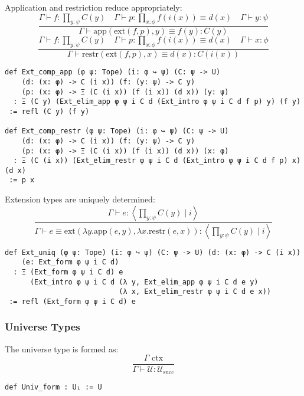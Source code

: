 \documentclass{article}
\begin{document}
\begin{theorem}
Application and restriction reduce appropriately:
\[
\frac{\Gamma \vdash f : \prod_{y : \psi} C(y) \quad \Gamma \vdash p : \prod_{x : \phi} f(i(x)) \equiv d(x) \quad \Gamma \vdash y : \psi}{\Gamma \vdash \text{app}(\text{ext}(f, p), y) \equiv f(y) : C(y)}
\]
\[
\frac{\Gamma \vdash f : \prod_{y : \psi} C(y) \quad \Gamma \vdash p : \prod_{x : \phi} f(i(x)) \equiv d(x) \quad \Gamma \vdash x : \phi}{\Gamma \vdash \text{restr}(\text{ext}(f, p), x) \equiv d(x) : C(i(x))}
\]
\begin{lstlisting}[mathescape=true]
def Ext_comp_app (φ ψ: Tope) (i: φ ↪ ψ) (C: ψ -> U)
    (d: (x: φ) -> C (i x)) (f: (y: ψ) -> C y)
    (p: (x: φ) -> Ξ (C (i x)) (f (i x)) (d x)) (y: ψ)
  : Ξ (C y) (Ext_elim_app φ ψ i C d (Ext_intro φ ψ i C d f p) y) (f y)
 := refl (C y) (f y)

def Ext_comp_restr (φ ψ: Tope) (i: φ ↪ ψ) (C: ψ -> U)
    (d: (x: φ) -> C (i x)) (f: (y: ψ) -> C y)
    (p: (x: φ) -> Ξ (C (i x)) (f (i x)) (d x)) (x: φ)
  : Ξ (C (i x)) (Ext_elim_restr φ ψ i C d (Ext_intro φ ψ i C d f p) x) (d x)
 := p x
\end{lstlisting}
\end{theorem}

\begin{theorem}
Extension types are uniquely determined:
\[
\frac{\Gamma \vdash e : \left\langle \prod_{y : \psi} C(y) \mid i \right\rangle}{\Gamma \vdash e \equiv \text{ext}(\lambda y . \text{app}(e, y), \lambda x . \text{restr}(e, x)) : \left\langle \prod_{y : \psi} C(y) \mid i \right\rangle}
\]
\begin{lstlisting}[mathescape=true]
def Ext_uniq (φ ψ: Tope) (i: φ ↪ ψ) (C: ψ -> U) (d: (x: φ) -> C (i x))
    (e: Ext_form φ ψ i C d)
  : Ξ (Ext_form φ ψ i C d) e
      (Ext_intro φ ψ i C d (λ y, Ext_elim_app φ ψ i C d e y)
                           (λ x, Ext_elim_restr φ ψ i C d e x))
 := refl (Ext_form φ ψ i C d) e
\end{lstlisting}
\end{theorem}

\subsubsection{Universe Types}

\begin{definition}
The universe type is formed as:
\[
\frac{\Gamma \text{ ctx}}{\Gamma \vdash \mathcal{U} : \mathcal{U}_{\text{succ}}}
\]
\begin{lstlisting}[mathescape=true]
def Univ_form : U₁ := U
\end{lstlisting}
\end{definition}
\end{document}
